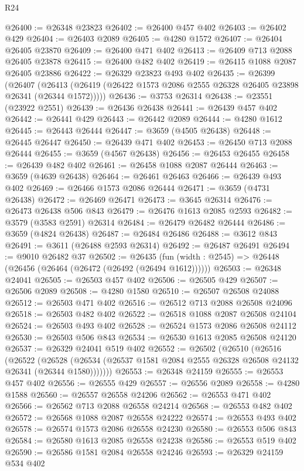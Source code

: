 \begin{lexlean}{R24}
\begin{coremodule}
@26400 := @26348 @23823
@26402 := @26400 @457 @402
@26403 := @26402 @429
@26404 := @26403 @2089
@26405 := @4280 @1572
@26407 := @26404 @26405 @23870
@26409 := @26400 @471 @402
@26413 := @26409 @713 @2088 @26405 @23878
@26415 := @26400 @482 @402
@26419 := @26415 @1088 @2087 @26405 @23886
@26422 := @26329 @23823 @493 @402
@26435 := @26399
    (@26407 (@26413 (@26419 (@26422 @1573 @2086 @2555 @26328 @26405 @23898 @26341 (@26344 @1572)))))
@26436 := @3753 @26314
@26438 := @23551 (@23922 @2551)
@26439 := @26436 @26438
@26441 := @26439 @457 @402
@26442 := @26441 @429
@26443 := @26442 @2089
@26444 := @4280 @1612
@26445 := @26443 @26444
@26447 := @3659 (@4505 @26438)
@26448 := @26445 @26447
@26450 := @26439 @471 @402
@26453 := @26450 @713 @2088 @26444
@26455 := @3659 (@4567 @26438)
@26456 := @26453 @26455
@26458 := @26439 @482 @402
@26461 := @26458 @1088 @2087 @26444
@26463 := @3659 (@4639 @26438)
@26464 := @26461 @26463
@26466 := @26439 @493 @402
@26469 := @26466 @1573 @2086 @26444
@26471 := @3659 (@4731 @26438)
@26472 := @26469 @26471
@26473 := @3645 @26314
@26476 := @26473 @26438 @506 @843
@26479 := @26476 @1613 @2085 @2593
@26482 := @3579 (@3583 @2591) @26314
@26484 := @26479 @26482 @26444
@26486 := @3659 (@4824 @26438)
@26487 := @26484 @26486
@26488 := @3612 @843
@26491 := @3611 (@26488 @2593 @26314)
@26492 := @26487 @26491
@26494 := @9010 @26482 @37
@26502 := @26435 (fun (width : @2545) => @26448 (@26456 (@26464 (@26472 (@26492 (@26494 @1612))))))
@26503 := @26348 @24041
@26505 := @26503 @457 @402
@26506 := @26505 @429
@26507 := @26506 @2089
@26508 := @4280 @1580
@26510 := @26507 @26508 @24088
@26512 := @26503 @471 @402
@26516 := @26512 @713 @2088 @26508 @24096
@26518 := @26503 @482 @402
@26522 := @26518 @1088 @2087 @26508 @24104
@26524 := @26503 @493 @402
@26528 := @26524 @1573 @2086 @26508 @24112
@26530 := @26503 @506 @843
@26534 := @26530 @1613 @2085 @26508 @24120
@26537 := @26329 @24041 @519 @402
@26552 := @26502
    (@26510
      (@26516
        (@26522
          (@26528 (@26534 (@26537 @1581 @2084 @2555 @26328 @26508 @24132 @26341 (@26344 @1580)))))))
@26553 := @26348 @24159
@26555 := @26553 @457 @402
@26556 := @26555 @429
@26557 := @26556 @2089
@26558 := @4280 @1588
@26560 := @26557 @26558 @24206
@26562 := @26553 @471 @402
@26566 := @26562 @713 @2088 @26558 @24214
@26568 := @26553 @482 @402
@26572 := @26568 @1088 @2087 @26558 @24222
@26574 := @26553 @493 @402
@26578 := @26574 @1573 @2086 @26558 @24230
@26580 := @26553 @506 @843
@26584 := @26580 @1613 @2085 @26558 @24238
@26586 := @26553 @519 @402
@26590 := @26586 @1581 @2084 @26558 @24246
@26593 := @26329 @24159 @534 @402

\end{coremodule}
\end{lexlean}
